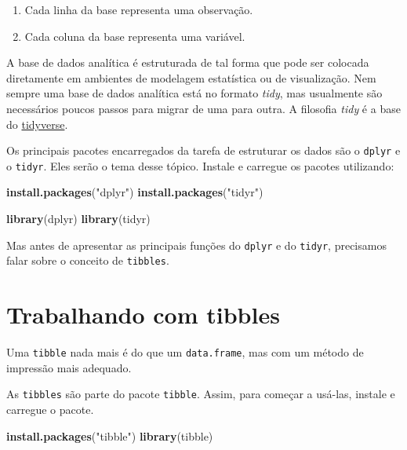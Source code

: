 \documentclass[
]{book}
\newenvironment{Shaded}{\begin{snugshade}}{\end{snugshade}}
\newcommand{\KeywordTok}[1]{\textcolor[rgb]{0.13,0.29,0.53}{\textbf{#1}}}
\newcommand{\NormalTok}[1]{#1}
\newcommand{\StringTok}[1]{\textcolor[rgb]{0.31,0.60,0.02}{#1}}
\providecommand{\tightlist}{%
  \setlength{\itemsep}{0pt}\setlength{\parskip}{0pt}}
\begin{document}
\begin{enumerate}
\def\labelenumi{\arabic{enumi}.}
\tightlist
\item
  Cada linha da base representa uma observação.
\item
  Cada coluna da base representa uma variável.
\end{enumerate}

A base de dados analítica é estruturada de tal forma que pode ser colocada diretamente em ambientes de modelagem estatística ou de visualização. Nem sempre uma base de dados analítica está no formato \emph{tidy}, mas usualmente são necessários poucos passos para migrar de uma para outra. A filosofia \emph{tidy} é a base do \href{https://www.tidyverse.org/}{tidyverse}.

Os principais pacotes encarregados da tarefa de estruturar os dados são o \texttt{dplyr} e o \texttt{tidyr}. Eles serão o tema desse tópico. Instale e carregue os pacotes utilizando:

\begin{Shaded}
\begin{Highlighting}[]
\KeywordTok{install.packages}\NormalTok{(}\StringTok{"dplyr"}\NormalTok{)}
\KeywordTok{install.packages}\NormalTok{(}\StringTok{"tidyr"}\NormalTok{)}

\KeywordTok{library}\NormalTok{(dplyr)}
\KeywordTok{library}\NormalTok{(tidyr)}
\end{Highlighting}
\end{Shaded}

Mas antes de apresentar as principais funções do \texttt{dplyr} e do \texttt{tidyr}, precisamos falar sobre o conceito de \texttt{tibbles}.

\hypertarget{trabalhando-com-tibbles}{%
\section{Trabalhando com tibbles}\label{trabalhando-com-tibbles}}

Uma \texttt{tibble} nada mais é do que um \texttt{data.frame}, mas com um método de impressão mais adequado.

As \texttt{tibbles} são parte do pacote \texttt{tibble}. Assim, para começar a usá-las, instale e carregue o pacote.

\begin{Shaded}
\begin{Highlighting}[]
\KeywordTok{install.packages}\NormalTok{(}\StringTok{"tibble"}\NormalTok{)}
\KeywordTok{library}\NormalTok{(tibble)}
\end{Highlighting}
\end{Shaded}
\end{document}
